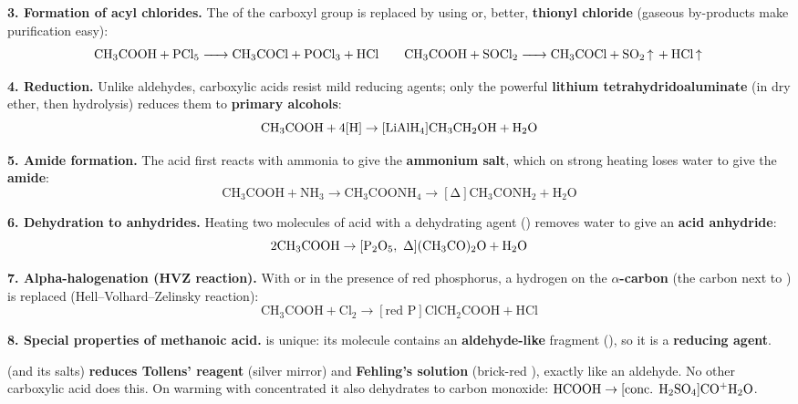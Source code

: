 \documentclass[11pt]{article}
\begin{document}
\textbf{3. Formation of acyl chlorides.} The  of the carboxyl group is replaced by  using  or, better, \textbf{thionyl chloride}  (gaseous by-products make purification easy):
\[ \ce{CH3COOH + PCl5 -> CH3COCl + POCl3 + HCl} \qquad \ce{CH3COOH + SOCl2 -> CH3COCl + SO2 ^ + HCl ^} \]

\textbf{4. Reduction.} Unlike aldehydes, carboxylic acids resist mild reducing agents; only the powerful \textbf{lithium tetrahydridoaluminate}  (in dry ether, then hydrolysis) reduces them to \textbf{primary alcohols}:
\[ \ensuremath{\mathrm{CH_{3}COOH + 4[H] \rightarrow [{\ce{LiAlH4}}] CH_{3}CH_{2}OH + H_{2}O}} \]

\textbf{5. Amide formation.} The acid first reacts with ammonia to give the \textbf{ammonium salt}, which on strong heating loses water to give the \textbf{amide}:
\[ \ensuremath{\mathrm{CH_{3}COOH + NH_{3} \rightarrow  CH_{3}COONH_{4} \rightarrow [\Delta] CH_{3}CONH_{2} + H_{2}O}} \]

\textbf{6. Dehydration to anhydrides.} Heating two molecules of acid with a dehydrating agent () removes water to give an \textbf{acid anhydride}:
\[ \ensuremath{\mathrm{2CH_{3}COOH \rightarrow [{\ce{P2O5},\ \Delta}] (CH_{3}CO)_{2}O + H_{2}O}} \]

\textbf{7. Alpha-halogenation (HVZ reaction).} With  or  in the presence of red phosphorus, a hydrogen on the \textbf{$\alpha$-carbon} (the carbon next to ) is replaced (Hell--Volhard--Zelinsky reaction):
\[ \ensuremath{\mathrm{CH_{3}COOH + Cl_{2} \rightarrow [{\text{red } P}] ClCH_{2}COOH + HCl}} \]

\textbf{8. Special properties of methanoic acid.}  is unique: its molecule contains an \textbf{aldehyde-like}  fragment (), so it is a \textbf{reducing agent}.

\begin{attention}
 (and its salts) \textbf{reduces Tollens' reagent} (silver mirror) and \textbf{Fehling's solution} (brick-red ), exactly like an aldehyde. No other carboxylic acid does this. On warming with concentrated  it also dehydrates to carbon monoxide: $\ensuremath{\mathrm{HCOOH \rightarrow [{\text{conc. } \ce{H2SO4}}] CO ^ + H_{2}O}}$.
\end{attention}
\end{document}
